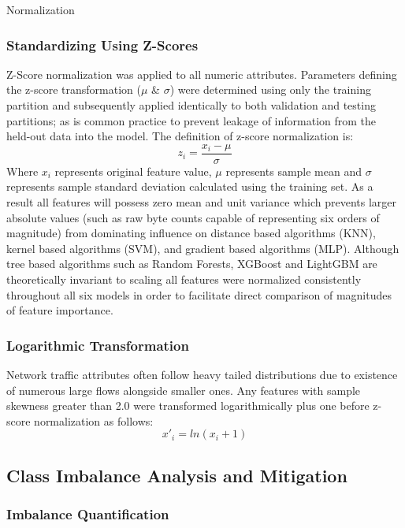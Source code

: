 Normalization

\subsubsection{Standardizing Using Z-Scores }

Z-Score normalization was applied to all numeric attributes. Parameters defining the z-score transformation ($\mu$ \& $\sigma$) were determined using only the training partition and subsequently applied identically to both validation and testing partitions; as is common practice to prevent leakage of information from the held-out data into the model. The definition of z-score normalization is:
\begin{equation}
z_{i}=\dfrac{x_{i}-\mu}{\sigma}
\label{eq:zscore}
\end{equation}
Where $x_{i}$ represents original feature value, $\mu$ represents sample mean and $\sigma$ represents sample standard deviation calculated using the training set. As a result all features will possess zero mean and unit variance which prevents larger absolute values (such as raw byte counts capable of representing six orders of magnitude) from dominating influence on distance based algorithms (KNN), kernel based algorithms (SVM), and gradient based algorithms (MLP). Although tree based algorithms such as Random Forests, XGBoost and LightGBM are theoretically invariant to scaling all features were normalized consistently throughout all six models in order to facilitate direct comparison of magnitudes of feature importance.

\subsubsection{Logarithmic Transformation }

Network traffic attributes often follow heavy tailed distributions due to existence of numerous large flows alongside smaller ones. Any features with sample skewness greater than 2.0 were transformed logarithmically plus one before z-score normalization as follows:
\begin{equation}
x'_{i}=ln(x_{i}+1)
\label{eq:log_transform}
\end{equation}

\subsection{Class Imbalance Analysis and Mitigation}

\subsubsection{Imbalance Quantification}

